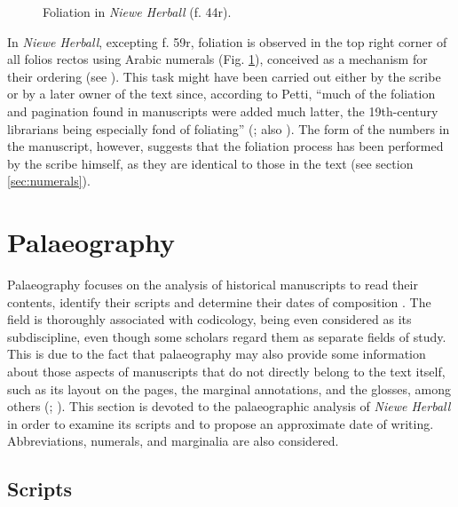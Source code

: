 \begin{paper}
 \begin{figure}[H]
    \centering
    \caption{Foliation in \emph{Niewe Herball} (f. 44r).}
    \label{fig:lorente10}
\end{figure}

In \emph{Niewe Herball}, excepting f. 59r, foliation is observed in the
top right corner of all folios rectos using Arabic
numerals (Fig. \ref{fig:lorente10}), conceived as a mechanism for their ordering (see
\cite[286]{romero-barranco_early_2017}). This task might have been carried out either by the
scribe or by a later owner of the text since, according to Petti, ``much
of the foliation and pagination found in manuscripts were added much
latter, the 19th-century librarians being especially fond of foliating''
(\cite[38]{petti_english_1977}; also \cite{denholm-young_handwriting_1954}). The form of the numbers in the
manuscript, however, suggests that the foliation process has been performed
by the scribe himself, as they are identical to those in the text (see
section \ref{sec:numerals}).


\section{Palaeography}

Palaeography focuses on the analysis of historical manuscripts to read their
contents, identify their scripts and determine their dates of
composition \citep[140]{mathisen_palaeography_2008}. The field is thoroughly associated
with codicology, being even considered as its subdiscipline, even though some scholars regard them as separate fields of study. This is due
to the fact that palaeography may also provide some information about
those aspects of manuscripts that do not directly belong to the text
itself, such as its layout on the pages, the marginal annotations, and
the glosses, among others (\cite[93]{gruijs_codicology_1972}; \cite[9--10]{derolez_palaeography_2003}). This
section is devoted to the palaeographic analysis of \emph{Niewe
Herball} in order to examine its scripts and to propose an approximate
date of writing. Abbreviations, numerals, and marginalia are also
considered.

\subsection{Scripts}


\end{paper}
